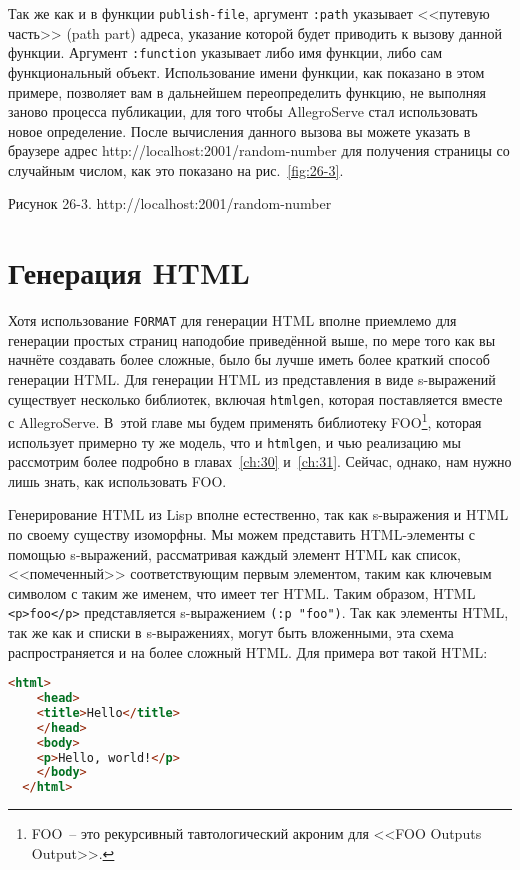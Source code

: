 Так же как и в функции \lstinline{publish-file}, аргумент \lstinline{:path} указывает <<путевую
часть>> (path part) адреса, указание которой будет приводить к вызову данной функции.
Аргумент \lstinline{:function} указывает либо имя функции, либо сам функциональный объект.
Использование имени функции, как показано в этом примере, позволяет вам в дальнейшем
переопределить функцию, не выполняя заново процесса публикации, для того чтобы AllegroServe
стал использовать новое определение. После вычисления данного вызова вы можете указать в
браузере адрес http://localhost:2001/random-number для получения страницы со случайным
числом, как это показано на рис.~\ref{fig:26-3}.

Рисунок 26-3. http://localhost:2001/random-number

\section{Генерация HTML}

Хотя использование \lstinline{FORMAT} для генерации HTML вполне приемлемо для
генерации простых страниц наподобие приведённой выше, по мере того как вы начнёте
создавать более сложные, было бы лучше иметь более краткий способ генерации HTML. Для
генерации HTML из представления в виде s-выражений существует несколько библиотек,
включая \lstinline{htmlgen}, которая поставляется вместе с AllegroServe. В~этой главе мы будем
применять библиотеку FOO\footnote{FOO~-- это рекурсивный тавтологический
  акроним для <<FOO Outputs Output>>.}, которая использует примерно ту же модель, что и
\texttt{htmlgen}, и чью реализацию мы рассмотрим более подробно в главах~\ref{ch:30}
и~\ref{ch:31}. Сейчас, однако, нам нужно лишь знать, как использовать FOO.

Генерирование HTML из Lisp вполне естественно, так как s-выражения и HTML по своему
существу изоморфны. Мы можем представить HTML-элементы с помощью s-выражений, рассматривая
каждый элемент HTML как список, <<помеченный>> соответствующим первым элементом, таким как
ключевым символом с таким же именем, что имеет тег HTML. Таким образом, HTML
\lstinline!<p>foo</p>! представляется s-выражением \lstinline{(:p "foo")}. Так как элементы
HTML, так же как и списки в s-выражениях, могут быть вложенными, эта схема распространяется
и на более сложный HTML. Для примера вот такой HTML:

\begin{lstlisting}[language=HTML]
  <html>
    <head>
    <title>Hello</title>
    </head>
    <body>
    <p>Hello, world!</p>
    </body>
  </html>
\end{lstlisting}

